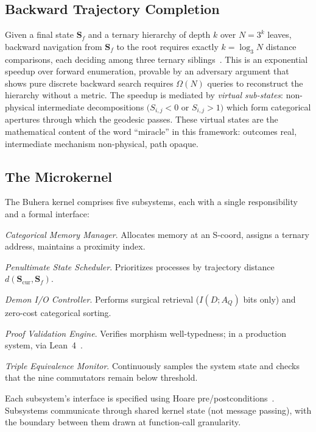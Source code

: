 \documentclass[11pt,twocolumn,a4paper]{article}
\newcommand{\Scoord}{\mathbf{S}}
\begin{document}
\subsection{Backward Trajectory Completion}

Given a final state $\Scoord_f$ and a ternary hierarchy of depth $k$ over $N = 3^k$ leaves, backward navigation from $\Scoord_f$ to the root requires exactly $k = \log_3 N$ distance comparisons, each deciding among three ternary siblings~\cite{poincare1890probleme,birkhoff1931proof}. This is an exponential speedup over forward enumeration, provable by an adversary argument that shows pure discrete backward search requires $\Omega(N)$ queries to reconstruct the hierarchy without a metric. The speedup is mediated by \emph{virtual sub-states}: non-physical intermediate decompositions $(S_{i,j} < 0$ or $S_{i,j} > 1)$ which form categorical apertures through which the geodesic passes. These virtual states are the mathematical content of the word ``miracle'' in this framework: outcomes real, intermediate mechanism non-physical, path opaque.

\subsection{The Microkernel}

The Buhera kernel comprises five subsystems, each with a single responsibility and a formal interface:
\begin{description}[leftmargin=*]
\item[\textbf{CMM}] \emph{Categorical Memory Manager}. Allocates memory at an S-coord, assigns a ternary address, maintains a proximity index.
\item[\textbf{PSS}] \emph{Penultimate State Scheduler}. Prioritizes processes by trajectory distance $d(\Scoord_{\text{cur}}, \Scoord_f)$.
\item[\textbf{DIC}] \emph{Demon I/O Controller}. Performs surgical retrieval ($I(D; A_Q)$ bits only) and zero-cost categorical sorting.
\item[\textbf{PVE}] \emph{Proof Validation Engine}. Verifies morphism well-typedness; in a production system, via Lean~4~\cite{moura2021lean4}.
\item[\textbf{TEM}] \emph{Triple Equivalence Monitor}. Continuously samples the system state and checks that the nine commutators remain below threshold.
\end{description}
Each subsystem's interface is specified using Hoare pre/postconditions~\cite{hoare1969axiomatic}. Subsystems communicate through shared kernel state (not message passing), with the boundary between them drawn at function-call granularity.
\end{document}

